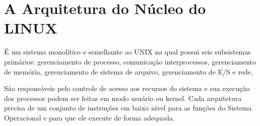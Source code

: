 \documentclass[
	12pt,				%
	oneside,   	        %
	a4paper,			%
	english,			%
	french,				%
	spanish,			%
	brazil,				%
	]{pacotes/abntex2}
\begin{document}



  
 
 


\textual

\makeatletter
\renewcommand{\chapter}{\@gobbletwo}
\makeatother

\section{\textbf{A Arquitetura do Núcleo do LINUX}}
\label{sec:arq-linux}

É um sistema monolítico e semelhante ao UNIX na qual possui seis subsistemas primários: gerenciamento de processo, comunicação interprocessos, gerenciamento de memória, gerenciamento de sistema de arquivo, gerenciamento de E/S e rede. \cite{nucleo-linux}

São responsáveis pelo controle de acesso aos recursos do sistema e sua execução dos processos podem ser feitas em modo usuário ou kernel. Cada arquitetura precisa de um conjunto de instruções em baixo nível para as funções do Sistema Operacional e para que ele execute de forma adequada. 
\end{document}

